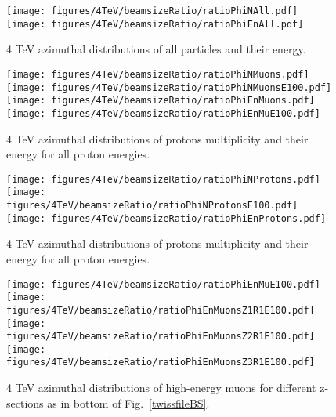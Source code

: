 \begin{figure}[!htb]
\begin{center}
  \texttt{[image: figures/4TeV/beamsizeRatio/ratioPhiNAll.pdf]}
  \texttt{[image: figures/4TeV/beamsizeRatio/ratioPhiEnAll.pdf]}
\end{center}
\vspace{-0.6cm}
 \caption{4 TeV azimuthal distributions of all particles and their energy.
  \label{bsRatioPhiAll}}
\end{figure}

\begin{figure}[!htb]
\begin{center}
  \texttt{[image: figures/4TeV/beamsizeRatio/ratioPhiNMuons.pdf]}
  \texttt{[image: figures/4TeV/beamsizeRatio/ratioPhiNMuonsE100.pdf]}
  \texttt{[image: figures/4TeV/beamsizeRatio/ratioPhiEnMuons.pdf]}
  \texttt{[image: figures/4TeV/beamsizeRatio/ratioPhiEnMuE100.pdf]}

\end{center}
\vspace{-0.6cm}
 \caption{4 TeV azimuthal distributions of protons multiplicity and their energy for all proton energies.
  \label{bsRatioPhiNPr}}
\end{figure}

\begin{figure}[!htb]
\begin{center}

  \texttt{[image: figures/4TeV/beamsizeRatio/ratioPhiNProtons.pdf]}
  \texttt{[image: figures/4TeV/beamsizeRatio/ratioPhiNProtonsE100.pdf]}
  \texttt{[image: figures/4TeV/beamsizeRatio/ratioPhiEnProtons.pdf]}
\end{center}
\vspace{-0.6cm}
 \caption{4 TeV azimuthal distributions of protons multiplicity and their energy for all proton energies.
  \label{bsRatioPhiNPr}}
\end{figure}

\begin{figure}[!htb]
\begin{center}
  \texttt{[image: figures/4TeV/beamsizeRatio/ratioPhiEnMuE100.pdf]}
  \texttt{[image: figures/4TeV/beamsizeRatio/ratioPhiEnMuonsZ1R1E100.pdf]}
  \texttt{[image: figures/4TeV/beamsizeRatio/ratioPhiEnMuonsZ2R1E100.pdf]}
  \texttt{[image: figures/4TeV/beamsizeRatio/ratioPhiEnMuonsZ3R1E100.pdf]}
\end{center}
\vspace{-0.6cm}
 \caption{4 TeV azimuthal distributions of high-energy muons for different z-sections as in bottom of Fig.~\ref{twissfileBS}.
  \label{bsRatioPhiEnMu}}
\end{figure}

